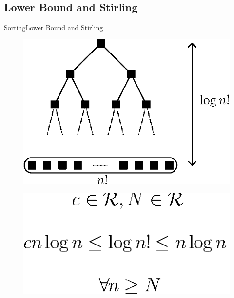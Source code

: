 \subsection{Lower Bound and Stirling}
\begin{frame}[c]{Sorting}{Lower Bound and Stirling}
\begin{figure}
\centering
\begin{minipage}{.5\textwidth}
  \centering
  \includegraphics[width=.8\linewidth]{fig/itlb-sort}
  \label{fig:itlb-sort}
\end{minipage}%
\begin{minipage}{.5\textwidth}
  \centering
  \includegraphics[width=.9\linewidth]{fig/stirling}
  \label{fig:stirling}
\end{minipage}
\end{figure}
\end{frame}